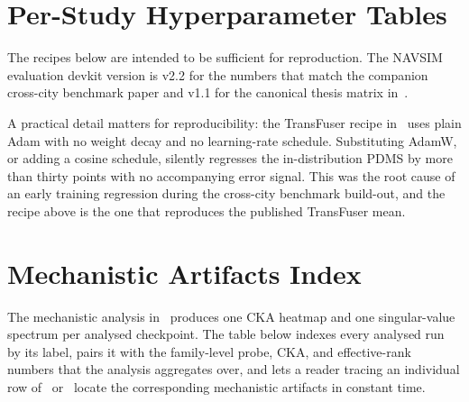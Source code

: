 \section{Per-Study Hyperparameter Tables}
\label{app:hparams}

The recipes below are intended to be sufficient for reproduction. The NAVSIM evaluation devkit version is v2.2 for the numbers that match the companion cross-city benchmark paper and v1.1 for the canonical thesis matrix in~.



A practical detail matters for reproducibility: the TransFuser recipe in~ uses plain Adam with no weight decay and no learning-rate schedule. Substituting AdamW, or adding a cosine schedule, silently regresses the in-distribution PDMS by more than thirty points with no accompanying error signal. This was the root cause of an early training regression during the cross-city benchmark build-out, and the recipe above is the one that reproduces the published TransFuser mean.

\section{Mechanistic Artifacts Index}
\label{app:mechanistic-index}

The mechanistic analysis in~ produces one CKA heatmap and one singular-value spectrum per analysed checkpoint. The table below indexes every analysed run by its label, pairs it with the family-level probe, CKA, and effective-rank numbers that the analysis aggregates over, and lets a reader tracing an individual row of~ or~ locate the corresponding mechanistic artifacts in constant time.


